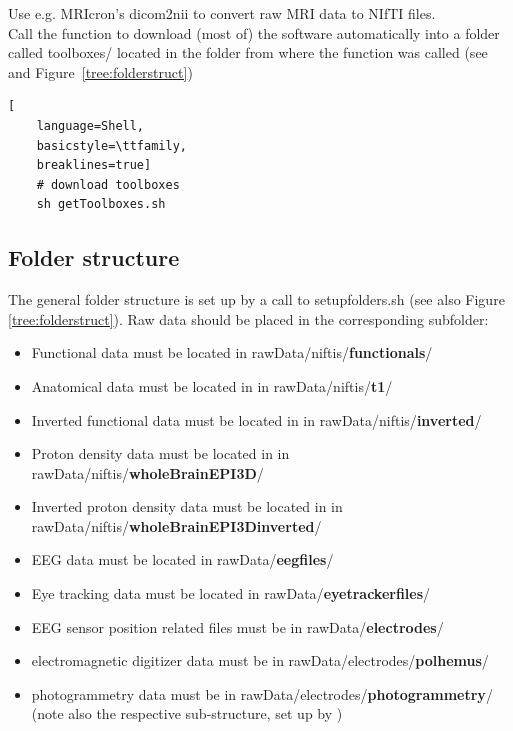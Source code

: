 \documentclass[12pt,a4paper]{scrartcl}
\begin{document}
\noindent Use e.g. MRIcron's dicom2nii to convert raw MRI data to NIfTI files.\\

\noindent Call the function \texttt{} to download (most of) the software automatically into a folder called toolboxes/ located in the folder from where the function was called (see \texttt{} and Figure~\ref{tree:folderstruct})\\
\begin{lstlisting}[
    language=Shell,
    basicstyle=\ttfamily,
    breaklines=true]
    # download toolboxes
    sh getToolboxes.sh
\end{lstlisting}

\subsection{Folder structure}
\label{sec:dirstruct}
The general folder structure is set up by a call to setupfolders.sh (see also Figure \ref{tree:folderstruct}). Raw data should be placed in the corresponding subfolder:
\begin{itemize}
\item Functional data must be located in rawData/niftis/\textbf{functionals}/
\item Anatomical data must be located in in rawData/niftis/\textbf{t1}/
\item Inverted functional data must be located in in rawData/niftis/\textbf{inverted}/
\item Proton density data must be located in in rawData/niftis/\textbf{wholeBrainEPI3D}/
\item Inverted proton density data must be located in in rawData/niftis/\textbf{wholeBrainEPI3Dinverted}/
\item EEG data must be located in rawData/\textbf{eegfiles}/
\item Eye tracking data must be located in rawData/\textbf{eyetrackerfiles}/
\item EEG sensor position related files must be in rawData/\textbf{electrodes}/
\item electromagnetic digitizer data must be in rawData/electrodes/\textbf{polhemus}/
\item photogrammetry data must be in rawData/electrodes/\textbf{photogrammetry}/ (note also the respective sub-structure, set up by \texttt{})
\end{itemize}
\end{document}
